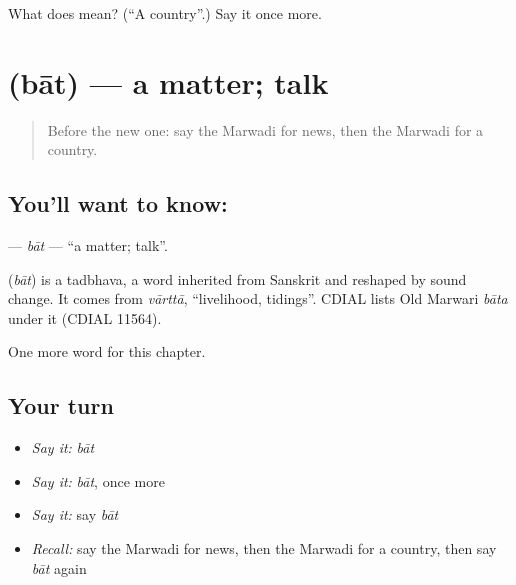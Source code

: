 \begin{tcolorbox}[breakable,colback=teal!4,colframe=teal!35!black,title={Before you move on}]
What does  mean? (\textquotedblleft{}A country\textquotedblright{}.) Say it once more.
\end{tcolorbox}
\section[\texorpdfstring{\mw{बात} (bāt)}{बात (bāt)}]{ (bāt) — a matter; talk}

\label{lesson:MW-C89-bat}



\begin{quote}
Before the new one: say the Marwadi for news, then the Marwadi for a country.
\end{quote}

\subsection*{You'll want to know: }
\textbf{} — \emph{bāt} — \textquotedblleft{}a matter; talk\textquotedblright{}.

\begin{cousinweb}
\textbf{} (\emph{bāt}) is a tadbhava, a word inherited from Sanskrit and reshaped by sound change. It comes from \emph{vārttā}, \textquotedblleft{}livelihood, tidings\textquotedblright{}. CDIAL lists Old Marwari \emph{bāta} under it (CDIAL 11564).
\end{cousinweb}

\begin{grammarlens}[title={What you've built}]
One more word for this chapter.
\end{grammarlens}

\subsection*{Your turn}
\begin{itemize}
\raggedright
  \item \emph{Say it:} \emph{bāt}
  \item \emph{Say it:} \emph{bāt}, once more
  \item \emph{Say it:} say \emph{bāt}
  \item \emph{Recall:} say the Marwadi for news, then the Marwadi for a country, then say \emph{bāt} again
\end{itemize}

